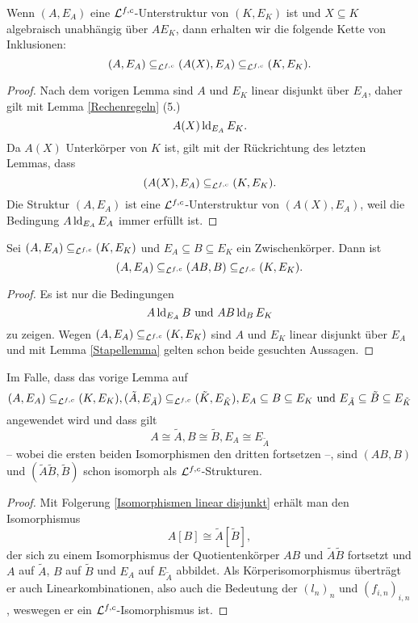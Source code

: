     \begin{lemma}\label{transz Erw}
    	Wenn $(A,E_A)$ eine $\mathcal{L}^{f,c}$-Unterstruktur von $(K,E_K)$ ist und $X\subseteq K$ algebraisch unabhängig über $AE_K$, dann erhalten wir die folgende Kette von Inklusionen: $$(A,E_A)\subseteq_{\mathcal{L}^{f,c}}(A(X),E_A)\subseteq_{\mathcal{L}^{f,c}}(K,E_K).$$
    \end{lemma}
    \begin{proof}
    	Nach dem vorigen Lemma sind $A$ und $E_K$ linear disjunkt über $E_A$, daher gilt mit Lemma \ref{Rechenregeln} (5.) $$A(X)\operatorname{ld}_{E_A}E_K.$$ Da $A(X)$ Unterkörper von $K$ ist, gilt mit der Rückrichtung des letzten Lemmas, dass $$(A(X),E_A)\subseteq_{\mathcal{L}^{f,c}}(K,E_K).$$
    	Die Struktur $(A,E_A)$ ist eine $\mathcal{L}^{f,c}$-Unterstruktur von $(A(X),E_A)$, weil die Bedingung $A\operatorname{ld}_{E_A} E_A$ immer erfüllt ist.
    \end{proof}
    
    \begin{lemma}\label{E-Erw}
    	Sei $(A,E_A)\subseteq_{\mathcal{L}^{f,c}}(K,E_K)$ und $E_A\subseteq B\subseteq E_K$ ein Zwischenkörper. Dann ist $$(A,E_A)\subseteq_{\mathcal{L}^{f,c}}(AB,B)\subseteq_{\mathcal{L}^{f,c}}(K,E_K).$$
    \end{lemma}
    \begin{proof}
    	Es ist nur die Bedingungen $$A\operatorname{ld}_{E_A}B\text{ und }AB\operatorname{ld}_BE_K$$ zu zeigen. Wegen $(A,E_A)\subseteq_{\mathcal{L}^{f,c}}(K,E_K)$ sind $A$ und $E_K$ linear disjunkt über $E_A$ und mit Lemma \ref{Stapellemma} gelten schon beide gesuchten Aussagen.
    \end{proof}
    \newpage
    \begin{lemma}\label{Fortsetzungslemma}
    	Im Falle, dass das vorige Lemma auf $$(A,E_A)\subseteq_{\mathcal{L}^{f,c}}(K,E_K),(\tilde{A},E_{\tilde{A}})\subseteq_{\mathcal{L}^{f,c}}(\tilde{K},E_{\tilde{K}}),E_A\subseteq B\subseteq E_K\text{ und }E_{\tilde{A}}\subseteq \tilde{B}\subseteq E_{\tilde{K}}$$ angewendet wird und dass gilt $$A\cong \tilde{A},B\cong \tilde{B},E_A\cong E_{\tilde{A}}$$ \--- wobei die ersten beiden Isomorphismen den dritten fortsetzen \---, sind $(AB,B)$ und $(\tilde{A}\tilde{B},\tilde{B})$ schon isomorph als $\mathcal{L}^{f,c}$-Strukturen.
    \end{lemma}
    \begin{proof}
    	Mit Folgerung \ref{Isomorphismen linear disjunkt} erhält man den Isomorphismus $$A[B]\cong\tilde{A}[\tilde{B}],$$ der sich zu einem Isomorphismus der Quotientenkörper $AB$ und $\tilde{A}\tilde{B}$ fortsetzt und $A$ auf $\tilde{A}$, $B$ auf $\tilde{B}$ und $E_A$ auf $E_{\tilde{A}}$ abbildet. Als Körperisomorphismus überträgt er auch Linearkombinationen, also auch die Bedeutung der $(l_n)_n$ und $(f_{i,n})_{i,n}$, weswegen er ein $\mathcal{L}^{f,c}$-Isomorphismus ist.
    \end{proof}
    
